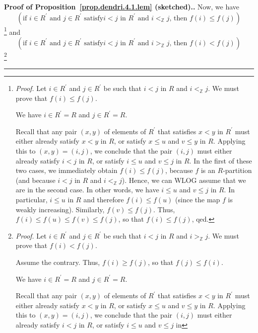 \documentclass[numbers=enddot,12pt,final,onecolumn,notitlepage]{scrartcl}%
\theoremstyle{definition}
\newenvironment{proof}[1][Proof]{\noindent\textbf{#1.} }{\ \rule{0.5em}{0.5em}}
\newenvironment{verlong}{}{}
\begin{document}
\begin{verlong}
\begin{proof}[Proof of Proposition~\ref{prop.dendri.4.1.lem} (sketched).]
Now, we have%
\[
\left(  \text{if }i\in R^{\prime}\text{ and }j\in R^{\prime}\text{ satisfy
}i<j\text{ in }R^{\prime}\text{ and }i<_{\mathbb{Z}}j\text{, then }f\left(
i\right)  \leq f\left(  j\right)  \right)
\]
\footnote{\textit{Proof.} Let $i\in R^{\prime}$ and $j\in R^{\prime}$ be such
that $i<j$ in $R$ and $i<_{\mathbb{Z}}j$. We must prove that $f\left(
i\right)  \leq f\left(  j\right)  $.
\par
We have $i\in R^{\prime}=R$ and $j\in R^{\prime}=R$.
\par
Recall that any pair $\left(  x,y\right)  $ of elements of $R^{\prime}$ that
satisfies $x<y$ in $R^{\prime}$ must either already satisfy $x<y$ in $R$, or
satisfy $x\leq u$ and $v\leq y$ in $R$. Applying this to $\left(  x,y\right)
=\left(  i,j\right)  $, we conclude that the pair $\left(  i,j\right)  $ must
either already satisfy $i<j$ in $R$, or satisfy $i\leq u$ and $v\leq j$ in
$R$. In the first of these two cases, we immediately obtain $f\left(
i\right)  \leq f\left(  j\right)  $, because $f$ is an $R$-partition (and
because $i<j$ in $R$ and $i<_{\mathbb{Z}}j$). Hence, we can WLOG assume that
we are in the second case. In other words, we have $i\leq u$ and $v\leq j$ in
$R$. In particular, $i\leq u$ in $R$ and therefore $f\left(  i\right)  \leq
f\left(  u\right)  $ (since the map $f$ is weakly increasing). Similarly,
$f\left(  v\right)  \leq f\left(  j\right)  $. Thus, $f\left(  i\right)  \leq
f\left(  u\right)  \leq f\left(  v\right)  \leq f\left(  j\right)  $, so that
$f\left(  i\right)  \leq f\left(  j\right)  $, qed.} and%
\[
\left(  \text{if }i\in R^{\prime}\text{ and }j\in R^{\prime}\text{ satisfy
}i<j\text{ in }R^{\prime}\text{ and }i>_{\mathbb{Z}}j\text{, then }f\left(
i\right)  <f\left(  j\right)  \right)
\]
\footnote{\textit{Proof.} Let $i\in R^{\prime}$ and $j\in R^{\prime}$ be such
that $i<j$ in $R$ and $i>_{\mathbb{Z}}j$. We must prove that $f\left(
i\right)  <f\left(  j\right)  $.
\par
Assume the contrary. Thus, $f\left(  i\right)  \geq f\left(  j\right)  $, so
that $f\left(  j\right)  \leq f\left(  i\right)  $.
\par
We have $i\in R^{\prime}=R$ and $j\in R^{\prime}=R$.
\par
Recall that any pair $\left(  x,y\right)  $ of elements of $R^{\prime}$ that
satisfies $x<y$ in $R^{\prime}$ must either already satisfy $x<y$ in $R$, or
satisfy $x\leq u$ and $v\leq y$ in $R$. Applying this to $\left(  x,y\right)
=\left(  i,j\right)  $, we conclude that the pair $\left(  i,j\right)  $ must
either already satisfy $i<j$ in $R$, or satisfy $i\leq u$ and $v\leq j$ in
}
\end{proof}
\end{verlong}
\end{document}
